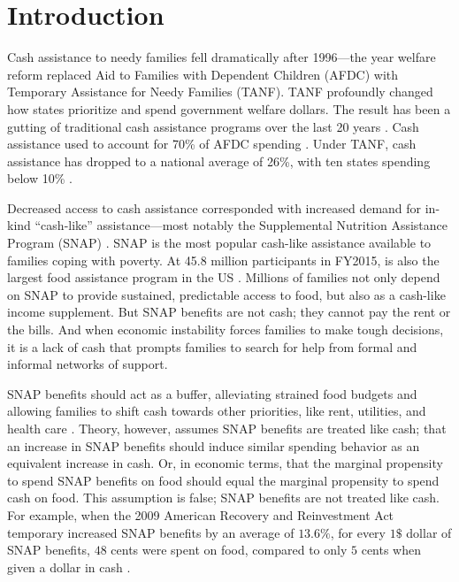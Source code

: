 \documentclass[12pt,letterpaperpaper,]{book}
\begin{document}
\section*{Introduction}\label{introduction}

Cash assistance to needy families fell dramatically after 1996---the
year welfare reform replaced Aid to Families with Dependent Children
(AFDC) with Temporary Assistance for Needy Families (TANF). TANF
profoundly changed how states prioritize and spend government welfare
dollars. The result has been a gutting of traditional cash assistance
programs over the last 20 years \citep{cbpp_chart_2016}. Cash assistance
used to account for 70\% of AFDC spending \citep{ziliak_temporary_2015}.
Under TANF, cash assistance has dropped to a national average of 26\%,
with ten states spending below 10\% \citep{schott_how_2015}.

Decreased access to cash assistance corresponded with increased demand
for in-kind ``cash-like'' assistance---most notably the Supplemental
Nutrition Assistance Program (SNAP)
\citep{us_department_of_health_and_human_services_welfare_2015}. SNAP is
the most popular cash-like assistance available to families coping with
poverty. At 45.8 million participants in FY2015, is also the largest
food assistance program in the US \citep{usda_fns_supplemental_2016}.
Millions of families not only depend on SNAP to provide sustained,
predictable access to food, but also as a cash-like income supplement.
But SNAP benefits are not cash; they cannot pay the rent or the bills.
And when economic instability forces families to make tough decisions,
it is a lack of cash that prompts families to search for help from
formal and informal networks of support.

SNAP benefits should act as a buffer, alleviating strained food budgets
and allowing families to shift cash towards other priorities, like rent,
utilities, and health care \citep{hoynes_snap_2015}. Theory, however,
assumes SNAP benefits are treated like cash; that an increase in SNAP
benefits should induce similar spending behavior as an equivalent
increase in cash. Or, in economic terms, that the marginal propensity to
spend SNAP benefits on food should equal the marginal propensity to
spend cash on food. This assumption is false; SNAP benefits are not
treated like cash. For example, when the 2009 American Recovery and
Reinvestment Act temporary increased SNAP benefits by an average of
\(13.6\%\), for every \(1\$\) dollar of SNAP benefits, \(48\) cents were
spent on food, compared to only \(5\) cents when given a dollar in cash
\citep{beatty_expenditure_2015}.
\end{document}
